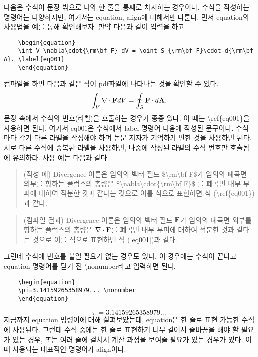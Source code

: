 \documentclass{gshs_thesis}
\begin{document}
다음은 수식이 문장 밖으로 나와 한 줄을 통째로 차지하는 경우이다. 수식을 작성하는 명령어는 다양하지만, 여기서는 equation, align에 대해서만 다룬다. 먼저 equation의 사용법을 예를 통해 확인해보자. 만약 다음과 같이 입력을 하고
\begin{lstlisting}
	\begin{equation}
	\int_V \nabla\cdot{\rm\bf F} dV = \oint_S {\rm\bf F}\cdot d{\rm\bf A}. \label{eq001}
	\end{equation}
\end{lstlisting}
컴파일을 하면 다음과 같은 식이 pdf파일에 나타나는 것을 확인할 수 있다.
\begin{equation}
\int_V \nabla\cdot{\rm\bf F} dV = \oint_S {\rm\bf F}\cdot d{\rm\bf A}. \label{eq001}
\end{equation}
문장 속에서 수식의 번호(라벨)을 호출하는 경우가 종종 있다. 이 때는 {\textbackslash}ref\{eq001\}을 사용하면 된다. 여기서 eq001은 수식에서 label 명령어 다음에 작성된 문구이다. 수식마다 각기 다른 라벨을 작성해야 하며 논문 저자가 기억하기 편한 것을 사용하면 된다. 서로 다른 수식에 중복된 라벨을 사용하면, 나중에 작성된 라벨의 수식 번호만 호출됨에 유의하라. 사용 예는 다음과 같다.
\begin{quote}
(작성 예) Divergence 이론은 임의의 벡터 필드 \${\textbackslash}rm{\textbackslash}bf F\$가 임의의 폐곡면 외부를 향하는 플럭스의 총량은 \${\textbackslash}nabla{\textbackslash}cdot\{{\textbackslash}rm{\textbackslash}bf F\}\$ 를 폐곡면 내부 부피에 대하여 적분한 것과 같다는 것으로 이를 식으로 표현하면 식 ({\textbackslash}ref\{eq001\}) 과 같다.
\end{quote}
\begin{quote}
(컴파일 결과) Divergence 이론은 임의의 벡터 필드 $\rm\bf F$가 임의의 폐곡면 외부를 향하는 플럭스의 총량은 $\nabla\cdot{\rm\bf F}$를 폐곡면 내부 부피에 대하여 적분한 것과 같다는 것으로 이를 식으로 표현하면 식 (\ref{eq001})과 같다.
\end{quote}
그런데 수식에 번호를 붙일 필요가 없는 경우도 있다. 이 경우에는 수식이 끝나고 equation 명령어를 닫기 전 {\textbackslash}nonumber라고 입력하면 된다.
\begin{lstlisting}
	\begin{equation}
	\pi=3.14159265358979... \nonumber
	\end{equation}
\end{lstlisting}
\begin{equation}
\pi=3.14159265358979... \nonumber
\end{equation}
지금까지 equation 명령어에 대해 살펴보았는데, equation은 한 줄로 표현 가능한 수식에 사용된다. 그런데 수식 중에는 한 줄로 표현하기 너무 길어서 줄바꿈을 해야 할 필요가 있는 경우, 또는 여러 줄에 걸쳐서 계산 과정을 보여줄 필요가 있는 경우가 있다. 이 때 사용되는 대표적인 명령어가 align이다.
\end{document}
